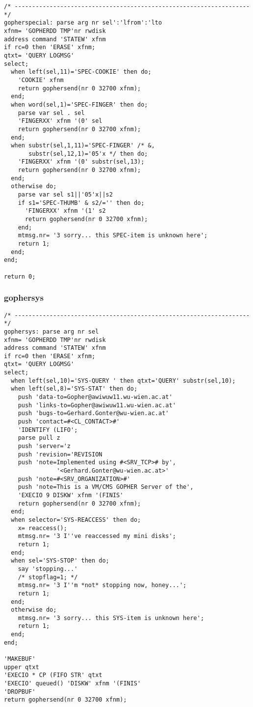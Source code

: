 \begin{verbatim}
/* ------------------------------------------------------------------- */
gopherspecial: parse arg nr sel':'lfrom':'lto
xfnm= 'GOPHERDD TMP'nr rwdisk
address command 'STATEW' xfnm
if rc=0 then 'ERASE' xfnm;
qtxt= 'QUERY LOGMSG'
select;
  when left(sel,11)='SPEC-COOKIE' then do;
    'COOKIE' xfnm
    return gophersend(nr 0 32700 xfnm);
  end;
  when word(sel,1)='SPEC-FINGER' then do;
    parse var sel . sel
    'FINGERXX' xfnm '(0' sel
    return gophersend(nr 0 32700 xfnm);
  end;
  when substr(sel,1,11)='SPEC-FINGER' /* &,
       substr(sel,12,1)='05'x */ then do;
    'FINGERXX' xfnm '(0' substr(sel,13);
    return gophersend(nr 0 32700 xfnm);
  end;
  otherwise do;
    parse var sel s1||'05'x||s2
    if s1='SPEC-THUMB' & s2/='' then do;
      'FINGERXX' xfnm '(1' s2
      return gophersend(nr 0 32700 xfnm);
    end;
    mtmsg.nr= '3 sorry... this SPEC-item is unknown here';
    return 1;
  end;
end;

return 0; 
\end{verbatim}

\subsubsection{gophersys}

\def\LPtopF{gophersys}

\begin{verbatim}
/* ------------------------------------------------------------------- */
gophersys: parse arg nr sel
xfnm= 'GOPHERDD TMP'nr rwdisk
address command 'STATEW' xfnm
if rc=0 then 'ERASE' xfnm;
qtxt= 'QUERY LOGMSG'
select;
  when left(sel,10)='SYS-QUERY ' then qtxt='QUERY' substr(sel,10);
  when left(sel,8)='SYS-STAT' then do;
    push 'data-to=Gopher@awiwuw11.wu-wien.ac.at'
    push 'links-to=Gopher@awiwuw11.wu-wien.ac.at'
    push 'bugs-to=Gerhard.Gonter@wu-wien.ac.at'
    push 'contact=#<CL_CONTACT>#'
    'IDENTIFY (LIFO';
    parse pull z
    push 'server='z
    push 'revision='REVISION
    push 'note=Implemented using #<SRV_TCP># by',
               '<Gerhard.Gonter@wu-wien.ac.at>'
    push 'note=#<SRV_ORGANIZATION>#'
    push 'note=This is a VM/CMS GOPHER Server of the',
    'EXECIO 9 DISKW' xfnm '(FINIS'
    return gophersend(nr 0 32700 xfnm);
  end;
  when selector='SYS-REACCESS' then do;
    x= reaccess();
    mtmsg.nr= '3 I''ve reaccessed my mini disks';
    return 1;
  end;
  when sel='SYS-STOP' then do;
    say 'stopping...'
    /* stopflag=1; */
    mtmsg.nr= '3 I''m *not* stopping now, honey...';
    return 1;
  end;
  otherwise do;
    mtmsg.nr= '3 sorry... this SYS-item is unknown here';
    return 1;
  end;
end;

'MAKEBUF'
upper qtxt
'EXECIO * CP (FIFO STR' qtxt
'EXECIO' queued() 'DISKW' xfnm '(FINIS'
'DROPBUF'
return gophersend(nr 0 32700 xfnm); 
\end{verbatim}

